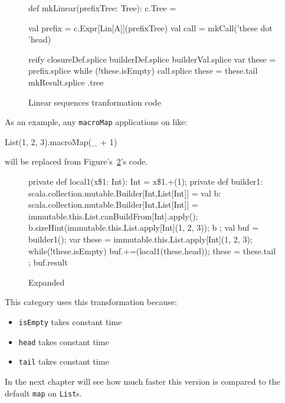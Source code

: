\begin{figure}
\begin{scalaCode}
 def mkLinear(prefixTree: Tree): c.Tree = {
  val prefix = c.Expr[Lin[A]](prefixTree)
  val call   = mkCall('these dot 'head)

  reify {
    closureDef.splice
    builderDef.splice
    builderVal.splice
    var these = prefix.splice
    while (!these.isEmpty) {
      call.splice
      these = these.tail
    }
    mkResult.splice
  }.tree
}
\end{scalaCode}
\caption[Linear sequences tranformation code]{Linear sequences tranformation code}
\label{lin_transf}
\end{figure}


As an example, any
\texttt{macroMap} applications on  like:
\begin{scalaCode}
List(1, 2, 3).macroMap(\_ + 1)
\end{scalaCode}
will be replaced from Figure's~\ref{list_expansion}'s code.

\begin{figure}
\begin{scalaCode}
{
  private def local1(x\$1: Int): Int = x\$1.+(1);
  private def builder1: scala.collection.mutable.Builder[Int,List[Int]] = {
    val b: scala.collection.mutable.Builder[Int,List[Int]] =
immutable.this.List.canBuildFrom[Int].apply();
    b.sizeHint(immutable.this.List.apply[Int](1, 2, 3));
    b
  };
  val buf = builder1();
  var these = immutable.this.List.apply[Int](1, 2, 3);
  while(!these.isEmpty){
    buf.+=(local1(these.head));
    these = these.tail
  };
  buf.result
}
\end{scalaCode}
\caption[Expanded ]{Expanded }
\label{list_expansion}
\end{figure}

This category uses this transformation because:
\begin{itemize}
 \item
  \texttt{isEmpty} takes constant time
 \item
  \texttt{head} takes constant time
 \item
  \texttt{tail} takes constant time
\end{itemize}

In the next chapter will see how much faster this version is compared to the
default \texttt{map} on \texttt{List}s.

